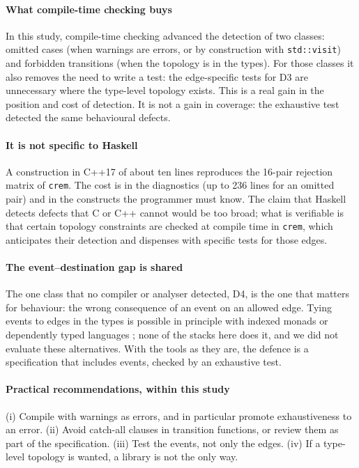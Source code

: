 \documentclass[review,12pt]{elsarticle}
\newcommand{\code}[1]{\texttt{#1}}
\newcommand{\crem}{\texttt{crem}}
\begin{document}
\paragraph{What compile-time checking buys} In this study, compile-time checking advanced the detection of two classes: omitted cases (when warnings are errors, or by construction with \code{std::visit}) and forbidden transitions (when the topology is in the types). For those classes it also removes the need to write a test: the edge-specific tests for D3 are unnecessary where the type-level topology exists. This is a real gain in the position and cost of detection. It is not a gain in coverage: the exhaustive test detected the same behavioural defects.

\paragraph{It is not specific to Haskell} A construction in C++17 of about ten lines reproduces the 16-pair rejection matrix of \crem{}. The cost is in the diagnostics (up to 236 lines for an omitted pair) and in the constructs the programmer must know. The claim that Haskell detects defects that C or C++ cannot would be too broad; what is verifiable is that certain topology constraints are checked at compile time in \crem{}, which anticipates their detection and dispenses with specific tests for those edges.

\paragraph{The event--destination gap is shared} The one class that no compiler or analyser detected, D4, is the one that matters for behaviour: the wrong consequence of an event on an allowed edge. Tying events to edges in the types is possible in principle with indexed monads \cite{atkey2009parameterised} or dependently typed languages \cite{brady2013idris}; none of the stacks here does it, and we did not evaluate these alternatives. With the tools as they are, the defence is a specification that includes events, checked by an exhaustive test.

\paragraph{Practical recommendations, within this study} (i) Compile with warnings as errors, and in particular promote exhaustiveness to an error. (ii) Avoid catch-all clauses in transition functions, or review them as part of the specification. (iii) Test the events, not only the edges. (iv) If a type-level topology is wanted, a library is not the only way.
\end{document}
